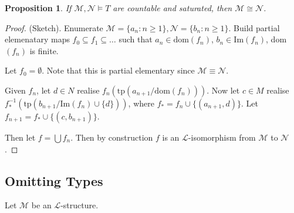 \documentclass[]{article}
\theoremstyle{custhm}
\theoremstyle{cusdef}
\theoremstyle{custhm}
\theoremstyle{custhm}
\theoremstyle{custhm}
\newtheorem{prop}[theorem]{Proposition}
\theoremstyle{ex}
\theoremstyle{custhm}
\theoremstyle{cusdef}
\theoremstyle{remark}
\theoremstyle{remark}
\renewcommand{\L}{\mathcal{L}}
\newcommand{\M}{\mathcal{M}}
\newcommand{\tp}{\textrm{tp}}
\newcommand{\N}{\mathcal{N}}
\renewcommand{\subset}{\subseteq}
\begin{document}
\begin{prop}
If $\M,\N\models T$ are countable and saturated, then $\M\cong\N$.
\end{prop}
\begin{proof}
(Sketch). Enumerate $\M = \{a_n:n\ge 1\},\N = \{b_n:n\ge 1\}$. Build partial elemenatary maps $f_0\subset f_1\subset \dots$ such that $a_n \in \textrm{dom}(f_n)$, $b_n\in \textrm{Im}(f_n)$, dom$(f_n)$ is finite.

Let $f_0 = \emptyset$. Note that this is partial elementary since $\M\equiv \N$.

Given $f_n$, let $d\in N$ realise $f_n\left(\tp\left(a_{n+1}/\textrm{dom}(f_n)\right)\right)$. Now let $c\in M$ realise $f_\ast^{-1}(\tp(b_{n+1}/\textrm{Im}(f_n)\cup\{d\}))$, where $f_\ast = f_n\cup\{(a_{n+1},d)\}$. Let $f_{n+1} = f_\ast \cup \{(c,b_{n+1})\}$.

Then let $f = \bigcup f_n$. Then by construction $f$ is an $\L$-isomorphism from $\M$ to $\N$.
\end{proof}

\subsection*{Omitting Types}

Let $\M$ be an $\L$-structure.
\end{document}
